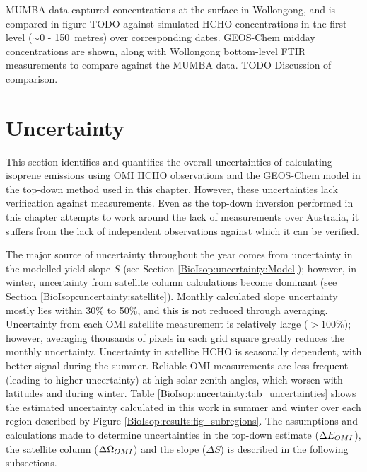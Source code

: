     
    
    MUMBA data captured concentrations at the surface in Wollongong, and is compared in figure TODO against simulated HCHO concentrations in the first level ($\sim$0 - 150~metres) over corresponding dates.
    GEOS-Chem midday concentrations are shown, along with Wollongong bottom-level FTIR measurements to compare against the MUMBA data.
    TODO Discussion of comparison.
    
\section{Uncertainty}
\label{BioIsop:uncertainty}
  
  
  This section identifies and quantifies the overall uncertainties of calculating isoprene emissions using OMI HCHO observations and the GEOS-Chem model in the top-down method used in this chapter.
  However, these uncertainties lack verification against measurements.
  Even as the top-down inversion performed in this chapter attempts to work around the lack of measurements over Australia, it suffers from the lack of independent observations against which it can be verified.
  
  The major source of uncertainty throughout the year comes from uncertainty in the modelled yield slope $S$ (see Section \ref{BioIsop:uncertainty:Model}); however, in winter, uncertainty from satellite column calculations become dominant (see Section \ref{BioIsop:uncertainty:satellite}).
  Monthly calculated slope uncertainty mostly lies within 30\% to 50\%, and this is not reduced through averaging.
  Uncertainty from each OMI satellite measurement is relatively large ($>100\%$); however, averaging thousands of pixels in each grid square greatly reduces the monthly uncertainty.
  Uncertainty in satellite HCHO is seasonally dependent, with better signal during the summer.
  Reliable OMI measurements are less frequent (leading to higher uncertainty) at high solar zenith angles, which worsen with latitudes and during winter.
  Table \ref{BioIsop:uncertainty:tab_uncertainties} shows the estimated uncertainty calculated in this work in summer and winter over each region described by Figure \ref{BioIsop:results:fig_subregions}.
  The assumptions and calculations made to determine uncertainties in the top-down estimate ($\Delta E_{OMI}$), the satellite column ($\Delta \Omega_{OMI}$) and the slope ($\Delta S$) is described in the following subsections.
  
